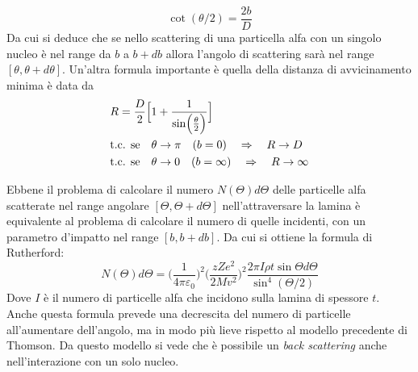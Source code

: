 \begin{equation}
\cot(\theta /2) = \frac{2 b}{D}
\label{angolo_di_scattering}
\end{equation}
Da cui si deduce che se nello scattering di una particella alfa con un singolo nucleo è nel range da $b$ a $b + db$ allora l'angolo di scattering sarà nel range $[\theta, \theta + d\theta]$.
Un'altra formula importante è quella della distanza di avvicinamento minima è data da
\begin{equation}
\begin{split}
& R = \frac{ D}{2 } \Bigl[ 1 + \frac{ 1}{\sin\Bigl(  \frac{\theta}{2 }  \Bigr) } \Bigr] \\
& \mbox{t.c. se} \quad \theta \to \pi \quad (b=0) \quad \Rightarrow \quad R \to D \\
& \mbox{t.c. se} \quad \theta \to 0 \quad (b=\infty) \quad \Rightarrow \quad R \to \infty
\end{split}
\end{equation}

Ebbene il problema di calcolare il numero $ N(\Theta) d\Theta$ delle particelle alfa scatterate nel range angolare $[\Theta, \Theta +d\Theta]$ nell'attraversare la lamina è equivalente al problema di calcolare il numero di quelle incidenti, con un parametro d'impatto nel range $[b, b +db]$.
Da cui si ottiene la formula di Rutherford:
\begin{equation}
N(\Theta)d\Theta = \biggl( \frac{1}{4\pi \varepsilon_0} \biggr) ^2  \biggl( \frac{z Z e^2}{2 M v^2} \biggr)^2  \frac{ 2 \pi I \rho t  \sin\Theta d\Theta }{ \sin^4(\Theta/2) }
\label{scattering_rutherford}
\end{equation}
Dove $I$ è il numero di particelle alfa che incidono sulla lamina di spessore $t$.
Anche questa formula prevede una decrescita del numero di particelle all'aumentare dell'angolo, ma in modo più lieve rispetto al modello precedente di Thomson.
Da questo modello si vede che è possibile un \textit{back scattering} anche nell'interazione con un solo nucleo.

